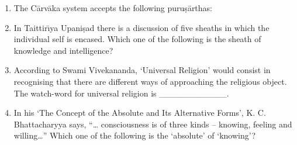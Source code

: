 \documentclass[12pt]{article}
\theoremstyle{remark}
\begin{document}
\begin{enumerate}
\begin{enumerate}
\end{enumerate}
\hfill{}
\item The C\={a}rv\={a}ka system accepts the following puru\d{s}\={a}rthas:
\begin{enumerate}
\end{enumerate}
\hfill{}
\item In Taittir\={\i}ya Upani\d{s}ad there is a discussion of five sheaths  in which the individual self is encased. Which one of the following is the sheath  of knowledge and intelligence?
\begin{enumerate}
\end{enumerate}
\hfill{}
\item According to Swami Vivekananda, ‘Universal Religion’ would consist in recognising that there are different ways of approaching the religious object. The watch-word for universal religion is \_\_\_\_\_\_\_\_\_\_\_.
\begin{enumerate}
\end{enumerate}
\hfill{}
\item In his ‘The Concept of the Absolute and Its Alternative Forms’, K. C. Bhattacharyya says, “… consciousness is of three kinds – knowing, feeling and willing…” Which one of the following is the ‘absolute’ of ‘knowing’?

\end{enumerate}
\end{document}
